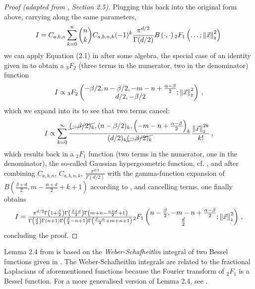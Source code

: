 \begin{proof}[Proof (adapted from \cite{2021-arbitrary-dimensions}, Section 2.5)]
  Plugging this back into the original form above, carrying along the same parameters,
  \begin{align*}
    I = C_{a,b,n} \sum_{k=0}^n \binom{n}{k} C_{a,b,n,k} (-1)^k \frac{\pi^{d/2}}{\Gamma(d/2)} B\left(\cdot, \cdot\right) {}_2F_1\left(\dots; \left\lVert\vec{x}\right\rVert_{\scriptscriptstyle 2}^2\right)\,
  \end{align*}
  we can apply Equation (2.1) in \cite{2021-arbitrary-dimensions} after some algebra, the special case of an identity given in \cite{1986-crazy-hypergeometric-properties} to obtain a ${}_3F_2$ (three terms in the numerator, two in the denominator) function
  \begin{align*}
    I \propto {}_3F_2\left(\begin{matrix}-\beta/2, n-\beta/2, -m-n+\frac{\alpha-\beta}{2} \\d/2, -\beta/2\end{matrix}; \left\lVert\vec{x}\right\rVert_{\scriptscriptstyle 2}^2\right)\,,
  \end{align*}
  which we expand into its  to see that two terms cancel:
  \begin{align*}
    I \propto \sum_{k=0}^{\infty} \frac{\cancel{(-\beta/2)_k}, (n-\beta/2)_k, \left(-m-n+\frac{\alpha-\beta}{2}\right)_k}{(d/2)_k \cancel{(-\beta/2)_k}} \frac{\left\lVert\vec{x}\right\rVert_{\scriptscriptstyle 2}^{2k}}{k!}\,,
  \end{align*}
  which results back in a ${}_2F_1$ function (two terms in the numerator, one in the denominator), the so-called Gaussian hypergeometric function, cf. , and after combining $C_{a,b,n}$, $C_{a,b,n,k}$, $\frac{\pi^{d/2}}{\Gamma(d/2)}$ with the gamma-function expansion of $B\left(\tfrac{\beta+d}{2}, m-\tfrac{\alpha+d}{2}+k+1\right)$ according to , and cancelling terms, one finally obtains
  $$I = \tfrac{\pi^{d/2} \Gamma \left(1+\frac{\beta}{2}\right) \Gamma \left(\frac{\beta+d}{2}\right) \Gamma \left(m+n-\frac{\alpha+d}{2}+1\right)}{\Gamma \left(\frac{d}{2}\right) \Gamma (n+1) \Gamma \left(\frac{\beta}{2}-n+1\right) \Gamma \left(\frac{\beta-\alpha}{2}+m+n+1\right)}{}_2F_1\left(\begin{matrix}n-\frac{\beta}{2}, -m-n+\frac{\alpha-\beta}{2} \\\frac{d}{2}\end{matrix};\left\lVert\vec{x}\right\rVert_{\scriptscriptstyle 2}^2\right)\,,$$
  concluding the proof.
\end{proof}

Lemma 2.4 from \cite{2011-porous-medium-1,1967-formulas-and-theorems} is based on the \textit{Weber-Schafheitlin} integral of two Bessel functions given in \cite{1945-bessel-integral}.
The Weber-Schafheitlin integrals are related to the fractional Laplacians of aforementioned functions because the Fourier transform of ${}_2F_1$ is a Bessel function.
For a more generalised version of Lemma 2.4, see \cite{2014-barenblatt}.

